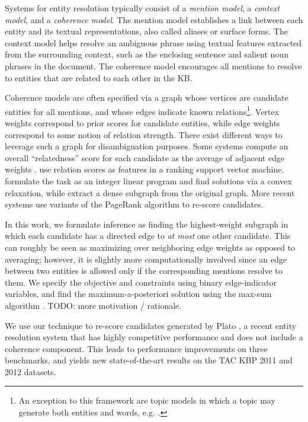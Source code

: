 \documentclass[11pt,letterpaper]{article}
\begin{document}
Systems for entity resolution typically consist of a \emph{mention model}, a \emph{context model}, and a \emph{coherence model}. The mention model establishes a link between each entity and its textual representations, also called aliases or surface forms. The context model helps resolve an ambiguous phrase using textual features extracted from the surrounding context, such as the enclosing sentence and salient noun phrases in the document. The coherence model encourages all mentions to resolve to entities that are related to each other in the KB. 

Coherence models are often specified via a graph whose vertices are candidate entities for all mentions, and whose edges indicate known relations\footnote{An exception to this framework are topic models in which a topic may generate both entities and words, e.g. \cite{HanS12,houlsby2014scalable}.}. Vertex weights correspond to prior scores for candidate entities, while edge weights correspond to some notion of relation strength. There exist different ways to leverage such a graph for disambiguation purposes. Some systems compute an overall ``relatedness'' score for each candidate as the average of adjacent edge weights \cite{Milne2008,Ferragina10}.  use relation scores as features in a ranking support vector machine.  formulate the task as an integer linear program and find solutions via a convex relaxation, while  extract a dense subgraph from the original graph. More recent systems \cite{Han2011,He13,Alhelbawy14,Pershina2015} use variants of the PageRank algorithm \cite{PageRank} to re-score candidates.  

In this work, we formulate inference as finding the highest-weight subgraph in which each candidate has a directed edge to \emph{at most} one other candidate. This can roughly be seen as maximizing over neighboring edge weights as opposed to averaging; however, it is slightly more computationally involved since an edge between two entities is allowed only if the corresponding mentions resolve to them. We specify the objective and constraints using binary edge-indicator variables, and find the maximum-a-posteriori solution using the max-sum algorithm \cite{Kschischang2001}. TODO: more motivation / rationale.
 
We use our technique to re-score candidates generated by Plato \cite{Lazic2015}, a recent entity resolution system that has highly competitive performance and does not include a coherence component. This leads to performance improvements on three benchmarks, and yields new state-of-the-art results on the TAC KBP 2011 and 2012 datasets.
\end{document}
